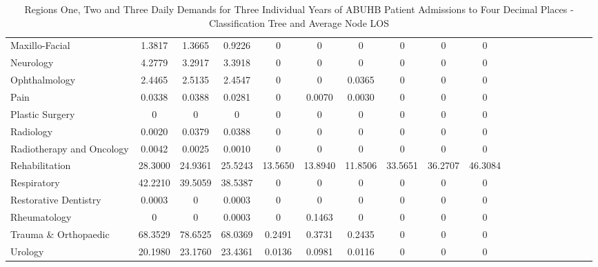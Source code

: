 \documentclass[thesis.tex]{subfiles}
\begin{document}
\begin{landscape}
\begin{table}[h!]
{\begin{tabular}{lcccccccccccccccccc}
Maxillo-Facial&	1.3817&	1.3665&	0.9226&	0&	0&	0	&0&	0	&0\\
Neurology&	4.2779&	3.2917	&3.3918&	0	&0&	0&	0&	0&	0\\
Ophthalmology	&2.4465&	2.5135	&2.4547	&0	&0	&0.0365	&0	&0&	0\\
Pain&	0.0338	&0.0388&	0.0281	&0	&0.0070	&0.0030	&0	&0	&0\\
Plastic Surgery	&0	&0	&0	&0	&0	&0	&0	&0&	0\\
Radiology&	0.0020	&0.0379	&0.0388&	0&	0&	0&	0	&0	&0\\
Radiotherapy and Oncology&	0.0042&	0.0025	&0.0010&	0&	0&	0	&0	&0	&0\\
Rehabilitation&	28.3000	&24.9361	&25.5243	&13.5650&	13.8940	&11.8506	&33.5651	&36.2707	&46.3084\\
Respiratory&	42.2210&	39.5059&	38.5387&	0&	0&	0&	0	&0&	0\\
Restorative Dentistry	&0.0003&	0&	0.0003	&0	&0	&0&	0	&0	&0\\
Rheumatology	&0&	0	&0.0003&0&	0.1463&	0&	0&	0&	0\\
Trauma \& Orthopaedic&	68.3529&	78.6525	&68.0369&	0.2491&	0.3731	&0.2435&	0&	0&	0\\
Urology	&20.1980&	23.1760&	23.4361	&0.0136	&0.0981&	0.0116	&0	&0	&0\\\bottomrule
    \end{tabular}  } 
\caption{Regions One, Two and Three Daily Demands for Three Individual Years of ABUHB Patient Admissions to Four Decimal Places - Classification Tree and Average Node LOS}
    \label{apptab:LinkedDemands7b}
\end{table}


   \begin{table}[h!]
    \centering{}
\end{table}
\end{landscape}
\end{document}
